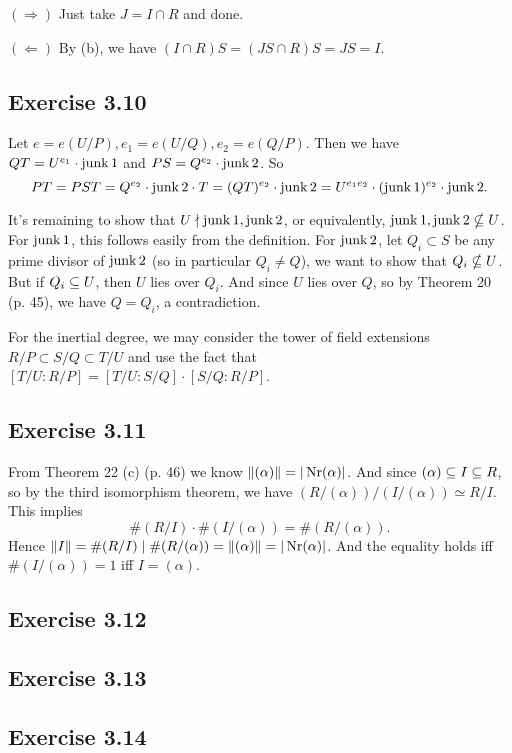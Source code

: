 \documentclass[../Marcus.tex]{subfiles}
\begin{document}
$(\Rightarrow)$ Just take $J=I\cap R$ and done.

$(\Leftarrow)$ By (b), we have $(I\cap R)S = (JS\cap R)S = JS = I$.

\subsection*{Exercise 3.10}

Let $e=e(U/P),e_1=e(U/Q),e_2=e(Q/P)$. Then we have $QT=U^{e_1}\cdot\operatorname{junk}1$ and $PS=Q^{e_2}\cdot\operatorname{junk}2$. So 
$$
PT = PST = Q^{e_2}\cdot\operatorname{junk}2\cdot T = (QT)^{e_2}\cdot\operatorname{junk}2 = U^{e_1e_2}\cdot(\operatorname{junk}1)^{e_2}\cdot\operatorname{junk}2.
$$

It's remaining to show that $U \nmid \operatorname{junk}1 , \operatorname{junk}2$, or equivalently, $\operatorname{junk}1,\operatorname{junk}2 \nsubseteq U$. For $\operatorname{junk}1$, this follows easily from the definition. For $\operatorname{junk}2$, let $Q_i\subset S$ be any prime divisor of $\operatorname{junk}2$ (so in particular $Q_i \neq Q$), we want to show that $Q_i \nsubseteq U$. But if $Q_i \subseteq U$, then $U$ lies over $Q_i$. And since $U$ lies over $Q$, so by Theorem 20 (p. 45), we have $Q=Q_i$, a contradiction.

For the inertial degree, we may consider the tower of field extensions $R/P\subset S/Q\subset T/U$ and use the fact that $[T/U:R/P]=[T/U:S/Q]\cdot[S/Q:R/P]$.

\subsection*{Exercise 3.11}

From Theorem 22 (c) (p. 46) we know $\|(\alpha)\|=|\operatorname{Nr}(\alpha)|$. And since $(\alpha)\subseteq I \subseteq R$, so by the third isomorphism theorem, we have $(R/(\alpha))/(I/(\alpha))\simeq R/I$. This implies 
$$
\#(R/I)\cdot\#(I/(\alpha))=\#(R/(\alpha)).
$$ 
Hence $\|I\|=\#(R/I)\mid \#(R/(\alpha))=\|(\alpha)\|=|\operatorname{Nr}(\alpha)|$. And the equality holds iff $\#(I/(\alpha))=1$ iff $I=(\alpha)$.

\subsection*{Exercise 3.12}

\subsection*{Exercise 3.13}

\subsection*{Exercise 3.14}
\end{document}
